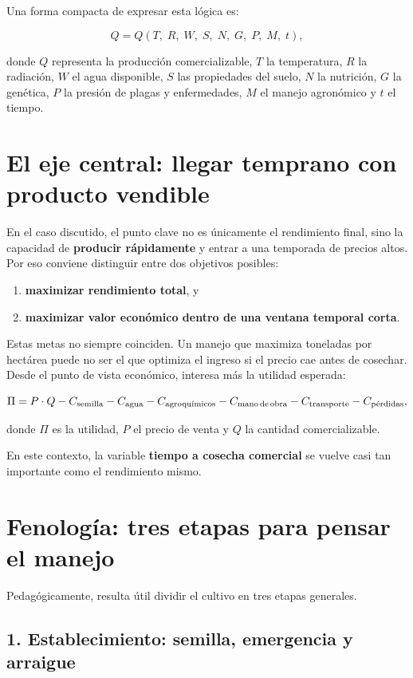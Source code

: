\documentclass[11pt,a4paper]{article}
\begin{document}
Una forma compacta de expresar esta lógica es:

\[
Q = Q\!\left(T,\; R,\; W,\; S,\; N,\; G,\; P,\; M,\; t\right),
\]

donde \(Q\) representa la producción comercializable, \(T\) la temperatura, \(R\) la radiación, \(W\) el agua disponible, \(S\) las propiedades del suelo, \(N\) la nutrición, \(G\) la genética, \(P\) la presión de plagas y enfermedades, \(M\) el manejo agronómico y \(t\) el tiempo.

\section{El eje central: llegar temprano con producto vendible}

En el caso discutido, el punto clave no es únicamente el rendimiento final, sino la capacidad de \textbf{producir rápidamente} y entrar a una temporada de precios altos. Por eso conviene distinguir entre dos objetivos posibles:

\begin{enumerate}[leftmargin=1.6em]
    \item \textbf{maximizar rendimiento total}, y
    \item \textbf{maximizar valor económico dentro de una ventana temporal corta}.
\end{enumerate}

Estas metas no siempre coinciden. Un manejo que maximiza toneladas por hectárea puede no ser el que optimiza el ingreso si el precio cae antes de cosechar. Desde el punto de vista económico, interesa más la utilidad esperada:

\[
\Pi = P \cdot Q - C_{\text{semilla}} - C_{\text{agua}} - C_{\text{agroquímicos}} - C_{\text{mano\,de\,obra}} - C_{\text{transporte}} - C_{\text{pérdidas}},
\]

donde \(\Pi\) es la utilidad, \(P\) el precio de venta y \(Q\) la cantidad comercializable.

En este contexto, la variable \textbf{tiempo a cosecha comercial} se vuelve casi tan importante como el rendimiento mismo.

\section{Fenología: tres etapas para pensar el manejo}

Pedagógicamente, resulta útil dividir el cultivo en tres etapas generales.

\subsection{1. Establecimiento: semilla, emergencia y arraigue}
\end{document}
